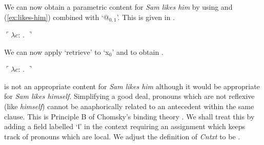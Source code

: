 We can now obtain a parametric content for \textit{Sam likes him} by
using \preveg{} and (\ref{ex:likes-him}) combined with `@$_{0,1}$'.
This is given in \nexteg{}.
\begin{ex} 
  $\ulcorner\lambda c$: . $\urcorner$
\end{ex} 
We can now apply `$\mathrm{retrieve}$' to `x$_0$' and \preveg{} to
obtain \nexteg{}.
\begin{ex} 
  $\ulcorner\lambda c$: . $\urcorner$
\end{ex} 
\preveg{} is not an appropriate content for \textit{Sam likes him}
although it would be appropriate for \textit{Sam likes himself}.
Simplifying a good deal,  pronouns which are not reflexive (like
\textit{himself}) cannot be anaphorically related to an antecedent
within the same clause.  This is Principle B of Chomsky's binding
theory \citep{Chomsky1981}.  We shall treat this by adding a field
labelled `$\mathfrak{l}$' in the context requiring an assignment which keeps track of pronouns
which are local. We adjust the definition of \textit{Cntxt} to be
\nexteg{}.
\begin{ex} 
\end{ex}
